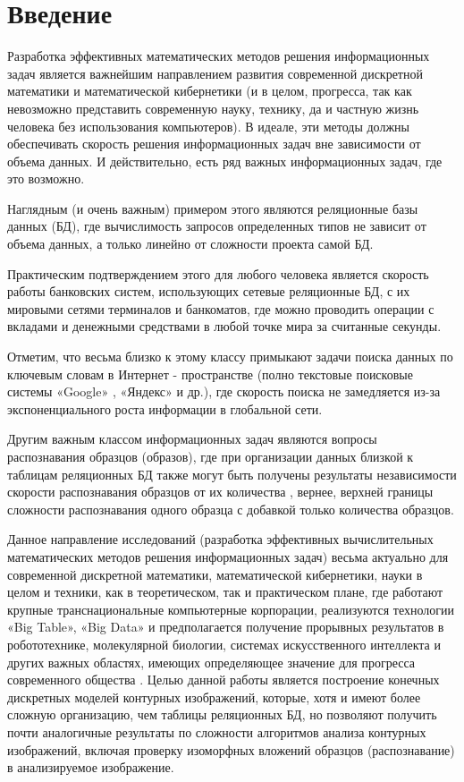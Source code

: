 \chapter*{Введение}							%

Разработка эффективных  математических методов решения информационных задач является важнейшим направлением развития современной  дискретной математики и математической кибернетики (и в целом, прогресса, так как невозможно представить современную науку, технику, да и частную жизнь человека  без использования компьютеров). 
В идеале, эти методы должны обеспечивать скорость решения  информационных задач вне зависимости от объема данных. И действительно, есть ряд важных  информационных задач, где это возможно. 

Наглядным (и очень важным) примером  этого являются реляционные базы данных (БД), где вычислимость запросов определенных типов не зависит от объема данных, а только линейно от сложности проекта самой БД.

Практическим подтверждением этого для любого человека является скорость работы банковских систем, использующих сетевые реляционные БД,  с их мировыми сетями терминалов и банкоматов, где можно проводить операции с вкладами и денежными средствами в любой точке мира за считанные секунды.

Отметим, что весьма близко к этому классу  примыкают задачи поиска данных по ключевым словам в Интернет - пространстве (полно текстовые поисковые системы «Google» \cite{BigData}, «Яндекс» и др.), где скорость поиска не замедляется из-за экспоненциального роста информации в глобальной сети.

Другим  важным классом информационных задач являются вопросы распознавания  образцов (образов), где при организации данных близкой к таблицам реляционных БД также могут быть получены результаты независимости скорости  распознавания  образцов от их количества \cite{Samara}, вернее, верхней границы сложности распознавания одного образца с добавкой только количества образцов. 

Данное направление исследований (разработка эффективных вычислительных математических методов решения информационных задач) весьма актуально для современной дискретной математики, математической кибернетики, науки в целом и техники, как в теоретическом, так и  практическом плане, где работают крупные транснациональные компьютерные корпорации, реализуются технологии «Big Table»,  «Big Data» и предполагается получение прорывных результатов в робототехнике, молекулярной биологии, системах искусственного интеллекта и других важных областях, имеющих определяющее значение для прогресса современного общества \cite{BigTable,BigData}.
Целью данной работы является построение конечных дискретных моделей контурных изображений, которые, хотя и имеют более сложную организацию, чем  таблицы реляционных БД, но позволяют получить почти аналогичные результаты по  сложности  алгоритмов анализа контурных изображений, включая проверку изоморфных вложений образцов (распознавание) в анализируемое изображение.

